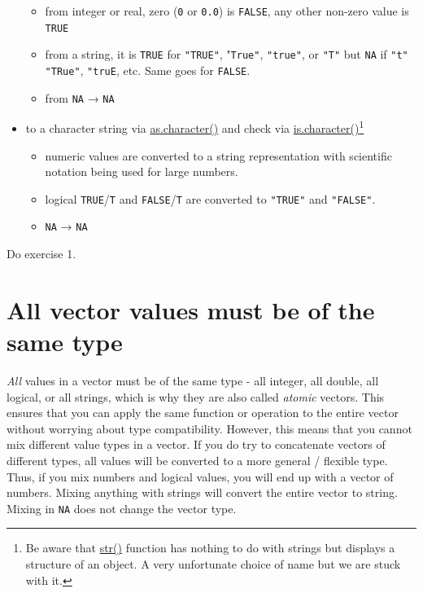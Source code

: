 \documentclass[
]{book}
\providecommand{\tightlist}{%
  \setlength{\itemsep}{0pt}\setlength{\parskip}{0pt}}
\begin{document}
\begin{itemize}
  \begin{itemize}
  \tightlist
  \item
    from integer or real, zero (\texttt{0} or \texttt{0.0}) is \texttt{FALSE}, any other non-zero value is \texttt{TRUE}
  \item
    from a string, it is \texttt{TRUE} for \texttt{"TRUE"}, "\texttt{True"}, \texttt{"true"}, or \texttt{"T"} but \texttt{NA} if \texttt{"t"} \texttt{"TRue"}, \texttt{"truE}, etc. Same goes for \texttt{FALSE}.
  \item
    from \texttt{NA} → \texttt{NA}
  \end{itemize}
\item
  to a character string via \href{(https://stat.ethz.ch/R-manual/R-devel/library/base/html/character.html)}{as.character()} and check via \href{(https://stat.ethz.ch/R-manual/R-devel/library/base/html/character.html)}{is.character()}\footnote{Be aware that \href{https://stat.ethz.ch/R-manual/R-devel/library/utils/html/str.html}{str()} function has nothing to do with strings but displays a structure of an object. A very unfortunate choice of name but we are stuck with it.}

  \begin{itemize}
  \tightlist
  \item
    numeric values are converted to a string representation with scientific notation being used for large numbers.
  \item
    logical \texttt{TRUE}/\texttt{T} and \texttt{FALSE}/\texttt{T} are converted to \texttt{"TRUE"} and \texttt{"FALSE"}.
  \item
    \texttt{NA} → \texttt{NA}
  \end{itemize}
\end{itemize}

Do exercise 1.

\hypertarget{vectors-are-homogeneous}{%
\section{All vector values must be of the same type}\label{vectors-are-homogeneous}}

\emph{All} values in a vector must be of the same type - all integer, all double, all logical, or all strings, which is why they are also called \emph{atomic} vectors. This ensures that you can apply the same function or operation to the entire vector without worrying about type compatibility. However, this means that you cannot mix different value types in a vector. If you do try to concatenate vectors of different types, all values will be converted to a more general / flexible type. Thus, if you mix numbers and logical values, you will end up with a vector of numbers. Mixing anything with strings will convert the entire vector to string. Mixing in \texttt{NA} does not change the vector type.
\end{document}
